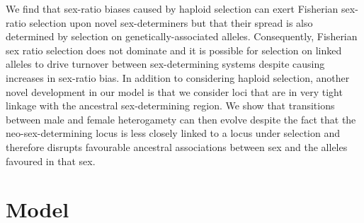 \documentclass[12pt]{article}
\begin{document}
We find that sex-ratio biases caused by haploid selection can exert Fisherian sex-ratio selection upon novel sex-determiners but that their spread is also determined by selection on genetically-associated alleles. 
Consequently, Fisherian sex ratio selection does not dominate and it is possible for selection on linked alleles to drive turnover between sex-determining systems despite causing increases in sex-ratio bias. 
In addition to considering haploid selection, another novel development in our model is that we consider loci that are in very tight linkage with the ancestral sex-determining region.
We show that transitions between male and female heterogamety can then evolve despite the fact that the neo-sex-determining locus is less closely linked to a locus under selection and therefore disrupts favourable ancestral associations between sex and the alleles favoured in that sex.

\section*{Model}
\end{document}
